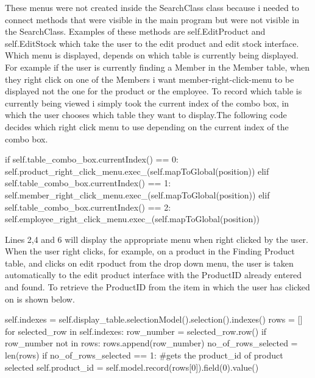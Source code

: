 These menus were not created inside the SearchClass class because i needed to connect methods that were visible in the main program but were not visible in the SearchClass. Examples of these methods are self.EditProduct and self.EditStock which take the user to the edit product and edit stock interface. Which menu is displayed, depends on which table is currently being displayed. For example if the user is currently finding a Member in the Member table, when they right click on one of the Members i want member-right-click-menu to be displayed not the one for the product or the employee. To record which table is currently being viewed i simply took the current index of the combo box, in which the user chooses which table they want to display.The following code decides which right click menu to use depending on the current index of the combo box.

\begin{python}
 if self.table_combo_box.currentIndex() == 0:
	 self.product_right_click_menu.exec_(self.mapToGlobal(position))
 elif self.table_combo_box.currentIndex() == 1:
	self.member_right_click_menu.exec_(self.mapToGlobal(position))
elif self.table_combo_box.currentIndex() == 2:
	self.employee_right_click_menu.exec_(self.mapToGlobal(position))
\end{python}

Lines 2,4 and 6 will display the appropriate menu when right clicked by the user. When the user right clicks, for example, on a product in the Finding Product table, and clicks on edit rpoduct from the drop down menu, the user is taken automatically to the edit product interface with the ProductID already entered and found. To retrieve the ProductID from the item in which the user has clicked on is shown below.

\begin{python}
self.indexes = self.display_table.selectionModel().selection().indexes()
rows = []
for selected_row in self.indexes:
	row_number = selected_row.row()
	if row_number not in rows:
		rows.append(row_number)      
no_of_rows_selected = len(rows)
if no_of_rows_selected == 1:
            #gets the product_id of product selected
            self.product_id = self.model.record(rows[0]).field(0).value()
\end{python}

